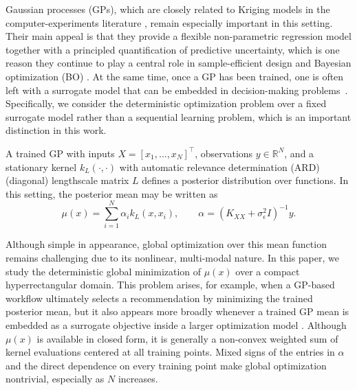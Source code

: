 \documentclass[pdflatex,sn-mathphys-num]{sn-jnl}%
\theoremstyle{thmstyleone}%
\theoremstyle{thmstyletwo}%
\theoremstyle{thmstylethree}%
\begin{document}
Gaussian processes (GPs), which are closely related to Kriging models in the computer-experiments literature \cite{kleijnen2009kriging}, remain especially important in this setting. Their main appeal is that they provide a flexible non-parametric regression model together with a principled quantification of predictive uncertainty, which is one reason they continue to play a central role in sample-efficient design and Bayesian optimization (BO) \cite{ref:gp_book,ref:bo_tutorial,ref:ego,ref:bo_review_a,ref:bo_review_b,paulson2025bayesian}. At the same time, once a GP has been trained, one is often left with a surrogate model that can be embedded in decision-making problems~\cite{ref:gp_embedded_exact}. Specifically, we consider the deterministic optimization problem over a fixed surrogate model rather than a sequential learning problem, which is an important distinction in this work. 

A trained GP with inputs $X=[x_1,\ldots,x_N]^\top$, observations $y \in \mathbb{R}^N$, and a stationary kernel $k_L(\cdot,\cdot)$ with automatic relevance determination (ARD) (diagonal) lengthscale matrix $L$ defines a posterior distribution over functions. In this setting, the posterior mean may be written as
\begin{equation}
\mu(x)=\sum_{i=1}^N \alpha_i k_L(x,x_i), \qquad 
\alpha = \left(K_{XX}+\sigma_\epsilon^2 I\right)^{-1} y.
\label{eq:gp_mean_sum}
\end{equation}

Although simple in appearance, global optimization over this mean function remains challenging due to its nonlinear, multi-modal nature. 
In this paper, we study the deterministic global minimization of $\mu(x)$ over a compact hyperrectangular domain. This problem arises, for example, when a GP-based workflow ultimately selects a recommendation by minimizing the trained posterior mean, but it also appears more broadly whenever a trained GP mean is embedded as a surrogate objective inside a larger optimization model \cite{Sacks1989DACE,SantnerWilliamsNotz2003,SantnerWilliamsNotz2019,Queipo2005Surrogate,ForresterKeane2009,Jones2001Taxonomy}. Although $\mu(x)$ is available in closed form, it is generally a non-convex weighted sum of kernel evaluations centered at all training points. Mixed signs of the entries in $\alpha$ and the direct dependence on every training point make global optimization nontrivial, especially as $N$ increases.
\end{document}
